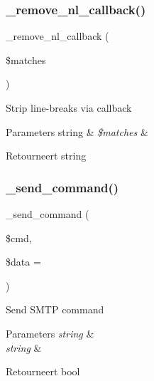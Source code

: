 \subsubsection{\texorpdfstring{\_remove\_nl\_callback()}{\_remove\_nl\_callback()}}
{\footnotesize\ttfamily \+\_\+remove\+\_\+nl\+\_\+callback (\begin{DoxyParamCaption}\item[{}]{\$matches }\end{DoxyParamCaption})\hspace{0.3cm}{\ttfamily [protected]}}

Strip line-\/breaks via callback


\begin{DoxyParams}[1]{Parameters}
string & {\em \$matches} & \\
\hline
\end{DoxyParams}
\begin{DoxyReturn}{Retourneert}
string 
\end{DoxyReturn}
\mbox{\label{class_c_i___email_a5431c3309ee720b3d1cc55c892359371}} 
\subsubsection{\texorpdfstring{\_send\_command()}{\_send\_command()}}
{\footnotesize\ttfamily \+\_\+send\+\_\+command (\begin{DoxyParamCaption}\item[{}]{\$cmd,  }\item[{}]{\$data = {\ttfamily \textquotesingle{}\textquotesingle{}} }\end{DoxyParamCaption})\hspace{0.3cm}{\ttfamily [protected]}}

Send S\+M\+TP command


\begin{DoxyParams}{Parameters}
{\em string} & \\
\hline
{\em string} & \\
\hline
\end{DoxyParams}
\begin{DoxyReturn}{Retourneert}
bool 
\end{DoxyReturn}
\mbox{\label{class_c_i___email_a42fa768e8678b3c1462762b9b812a302}} 
